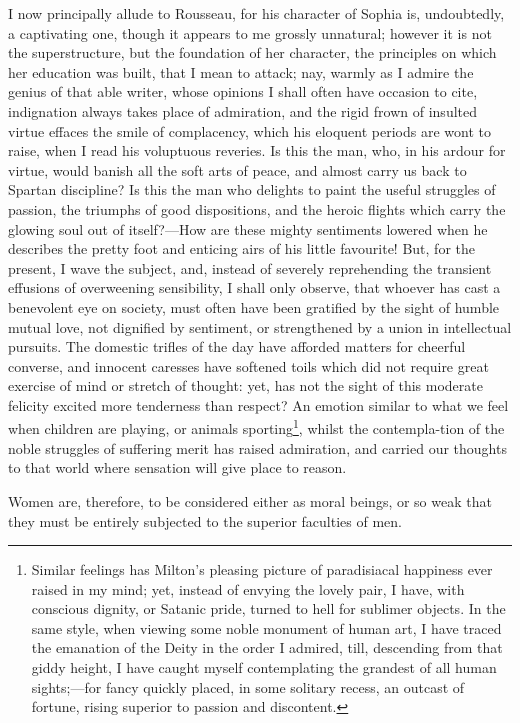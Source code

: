 I now principally allude to Rousseau, for his character of Sophia is,
undoubtedly, a captivating one, though it appears to me grossly
unnatural; however it is not the superstructure, but the foundation of
her character, the principles on which her education was built, that I
mean to attack; nay, warmly as I admire the genius of that able
writer, whose opinions I shall often have occasion to cite,
indignation always takes place of admiration, and the rigid frown of
insulted virtue effaces the smile of complacency, which his eloquent
periods are wont to raise, when I read his voluptuous reveries. Is
this the man, who, in his ardour for virtue, would banish all the soft
arts of peace, and almost carry us back to Spartan discipline? Is this
the man who delights to paint the useful struggles of passion, the
triumphs  of good dispositions, and the heroic flights which
carry the glowing soul out of itself?---How are these mighty
sentiments lowered when he describes the pretty foot and enticing airs
of his little favourite! But, for the present, I wave the subject,
and, instead of severely reprehending the transient effusions of
overweening sensibility, I shall only observe, that whoever has cast a
benevolent eye on society, must often have been gratified by the sight
of humble mutual love, not dignified by sentiment, or strengthened by
a union in intellectual pursuits. The domestic trifles of the day have
afforded matters for cheerful converse, and innocent caresses have
softened toils which did not require great exercise of mind or stretch
of thought: yet, has not the sight of this moderate felicity excited
more tenderness than respect? An emotion similar to what we feel when
children are playing, or animals sporting\footnote{Similar feelings
has Milton's pleasing picture of paradisiacal happiness ever raised in
my mind; yet, instead of envying the lovely pair, I have, with
conscious dignity, or Satanic pride, turned to hell for sublimer
objects. In the same style, when viewing some noble monument of human
art, I have traced the emanation of the Deity in the order I admired,
till, descending from that giddy height, I have caught myself
contemplating the grandest of all human sights;---for fancy quickly
placed, in some solitary recess, an outcast of fortune, rising
superior to passion and discontent.}, whilst the
contempla-tion of the noble struggles of suffering merit has
raised admiration, and carried our thoughts to that world where
sensation will give place to reason.

Women are, therefore, to be considered either as moral beings, or so
weak that they must be entirely subjected to the superior faculties of
men.

